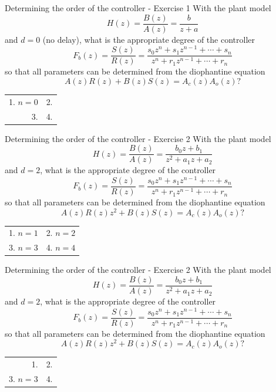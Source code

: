 \documentclass[presentation,aspectratio=169]{beamer}
\begin{document}
\begin{frame}[label=sec-3-4]{Determining the order of the controller - Exercise 1}
With the plant model \[H(z) = \frac{B(z)}{A(z)} = \frac{b}{z + a}\] and \(d=0\) (no delay), what is the appropriate degree of the controller \[F_b(z) = \frac{S(z)}{R(z)} = \frac{s_0z^n + s_1z^{n-1} + \cdots + s_n}{z^n + r_1 z^{n-1} + \cdots + r_n}\]
so that all parameters can be determined from the diophantine equation
\[ A(z)R(z) + B(z)S(z) = A_c(z)A_o(z)?\]
\begin{center}
\begin{tabular}{rr}
1. \(n = 0\) & 2.\\
3. & 4.\\
\end{tabular}
\end{center}
\end{frame}

\begin{frame}[label=sec-3-5]{Determining the order of the controller - Exercise 2}
With the plant model \[H(z) = \frac{B(z)}{A(z)} = \frac{b_0z + b_1}{z^2 + a_1z + a_2}\] and \(d=2\), what is the appropriate degree of the controller \[F_b(z) = \frac{S(z)}{R(z)} = \frac{s_0z^n + s_1z^{n-1} + \cdots + s_n}{z^n + r_1 z^{n-1} + \cdots + r_n}\]
so that all parameters can be determined from the diophantine equation
\[ A(z)R(z)z^2 + B(z)S(z) = A_c(z)A_o(z)?\]
\begin{center}
\begin{tabular}{ll}
1. \(n = 1\) & 2. \(n = 2\)\\
3. \(n=3\) & 4. \(n=4\)\\
\end{tabular}
\end{center}
\end{frame}

\begin{frame}[label=sec-3-6]{Determining the order of the controller - Exercise 2}
With the plant model \[H(z) = \frac{B(z)}{A(z)} = \frac{b_0z + b_1}{z^2 + a_1z + a_2}\] and \(d=2\), what is the appropriate degree of the controller \[F_b(z) = \frac{S(z)}{R(z)} = \frac{s_0z^n + s_1z^{n-1} + \cdots + s_n}{z^n + r_1 z^{n-1} + \cdots + r_n}\]
so that all parameters can be determined from the diophantine equation
\[ A(z)R(z)z^2 + B(z)S(z) = A_c(z)A_o(z)?\]
\begin{center}
\begin{tabular}{rr}
1. & 2.\\
3. \(n=3\) & 4.\\
\end{tabular}
\end{center}
\end{frame}
\end{document}
